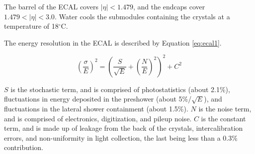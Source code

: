 The barrel of the ECAL covers $|\eta| < 1.479$, and the endcaps cover $1.479 < |\eta| < 3.0 $. Water cools the submodules containing the crystals at a temperature of 18$^{\circ}$C.


The energy resolution in the ECAL is described by Equation \ref{eq:ecal1}.

\begin{equation}
\left( \frac{\sigma}{E} \right)^2 = \left( \frac{S}{\sqrt{E}} + \left( \frac{N}{E} \right)^2\right)^2 + C^2
\label{eq:ecal1}
\end{equation}

$S$ is the stochastic term, and is comprised of photostatistics (about 2.1\%), fluctuations in energy deposited in the preshower (about 5\%/$\sqrt{E}$), and fluctuations in the lateral shower containment (about 1.5\%). $N$ is the noise term, and is comprised of electronics, digitization, and pileup noise. $C$ is the constant term, and is made up of leakage from the back of the crystals, intercalibration errors, and non-uniformity in light collection, the last being less than a 0.3\% contribution.
